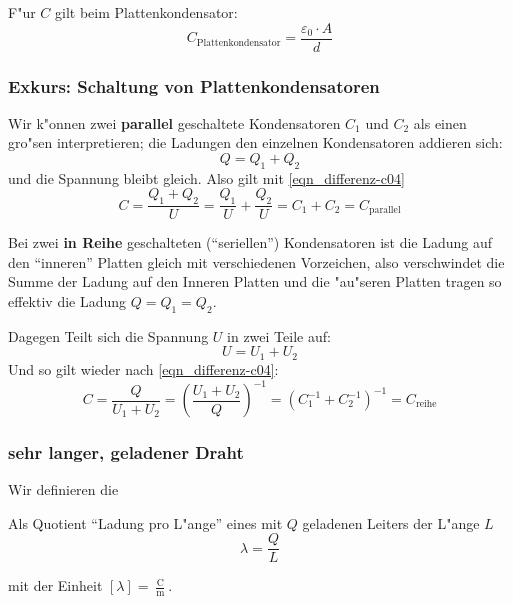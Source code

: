 \bigskip
F"ur $C$ gilt beim Plattenkondensator:
\begin{equation}
   \label{eqn_differenz-c05}
   C_\text{Plattenkondensator} = \frac{\varepsilon_0 \cdot A}{d}
\end{equation}




\subsubsection{Exkurs: Schaltung von Plattenkondensatoren}
\label{kap_schaltung-von-plattenkondensatoren}

Wir k"onnen zwei \textbf{parallel} geschaltete Kondensatoren $C_1$ und $C_2$ als einen gro"sen
interpretieren; die Ladungen den einzelnen Kondensatoren addieren
sich:
$$
Q = Q_1 + Q_2
$$
und die Spannung bleibt gleich. Also gilt mit \eqref{eqn_differenz-c04}
\begin{equation}
   \label{eqn_differenz-c06}
   C = \frac{Q_1 +  Q_2}{U} = \frac{Q_1}{U} + \frac{Q_2}{U} = \boxed{ C_1 +
   C_2 =   C_\text{parallel}}
\end{equation}



Bei zwei \textbf{in Reihe} geschalteten ("`seriellen"') Kondensatoren
ist die Ladung auf den "`inneren"' Platten gleich mit verschiedenen
Vorzeichen, also verschwindet die Summe der Ladung auf den Inneren
Platten und die "au"seren Platten tragen so effektiv die Ladung $Q = Q_1
= Q_2$.

Dagegen Teilt sich die Spannung $U$ in zwei Teile auf:
$$
U = U_1 + U_2
$$
Und so gilt wieder nach \eqref{eqn_differenz-c04}:
\begin{equation}
   \label{eqn_differenz-c07}
   C = \frac{Q}{U_1 + U_2} =
\left ( \frac{U_1 + U_2}{Q} \right )^{-1} =
\boxed{
\left ( C_1^{-1} + C_2^{-1} \right )^{-1} = C_\text{reihe}
}
\end{equation}






\subsubsection{sehr langer, geladener Draht}
\label{kap_unendlich-langer-geladener-draht}


Wir definieren die
\begin{Def}
    Als
   Quotient "`Ladung pro L"ange"' eines mit $Q$ geladenen Leiters der
   L"ange $L$
\begin{equation}
   \label{eqn_differenz-c09}
   \lambda = \frac{Q}{L}
\end{equation}
\end{Def}
mit der Einheit $[\lambda] =
\frac{\operatorname{C}}{\operatorname{m}}$.

